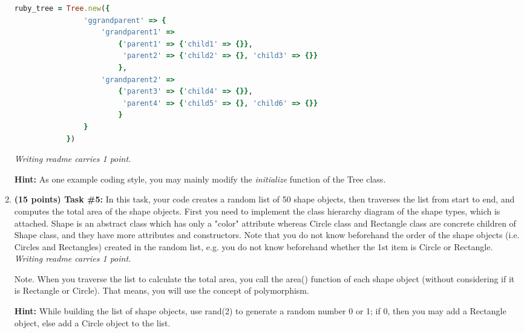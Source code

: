 \documentclass[paper=letter, fontsize=11pt]{scrartcl} %
\begin{document}
\begin{enumerate}[noitemsep]
        \begin{lstlisting}[language=Ruby]
            ruby_tree = Tree.new({
                'ggrandparent' => { 
                    'grandparent1' => 
                        {'parent1' => {'child1' => {}},
                         'parent2' => {'child2' => {}, 'child3' => {}} 
                        }, 
                    'grandparent2' => 
                        {'parent3' => {'child4' => {}}, 
                         'parent4' => {'child5' => {}, 'child6' => {}} 
                        }
                } 
            })
        \end{lstlisting}
\emph{Writing readme carries 1 point.}

\textbf{Hint:} As one example coding style, you may mainly modify the \emph{initialize} function of the Tree class.
       \item \textbf{(15 points) Task \#5:} In this task, your code creates a random list of 50 shape objects, 
then traverses the list from start to end, and computes the total area of the shape objects. 
First you need to implement the class hierarchy diagram of the shape types, which is attached. 
Shape is an abstract class which has only a "color" attribute whereas Circle class and Rectangle 
class are concrete children of Shape class, and they have more attributes and constructors. 
Note that you do not know beforehand the order of the shape objects 
(i.e. Circles and Rectangles) created in the random list, e.g. you do not know beforehand whether the 1st item is Circle or Rectangle.
\emph{Writing readme carries 1 point.}

Note. When you traverse the list to calculate the total area, you call the area() function of each shape object (without considering if it is Rectangle or Circle). That means, you will use the concept of polymorphism.

\textbf{Hint:} While building the list of shape objects, use rand(2) to generate a random number 0 or 1; if 0, then you may add a Rectangle object, else add a Circle object to the list.
    \end{enumerate}
       
\end{document}
